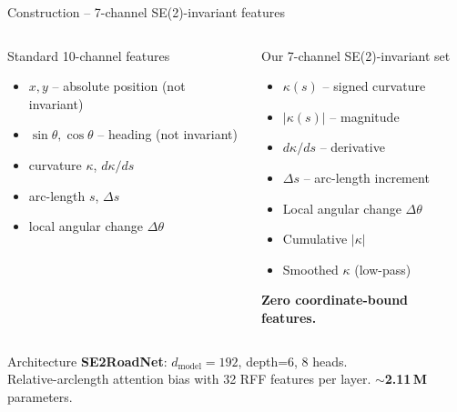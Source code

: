 \documentclass[aspectratio=169,10pt]{beamer}
\begin{document}
\begin{frame}{Construction -- 7-channel SE(2)-invariant features}
\begin{columns}[T]
\begin{block}{Standard 10-channel features}
\scriptsize
\begin{itemize}
  \item $x, y$ -- absolute position (\textcolor{alert}{not invariant})
  \item $\sin\theta, \cos\theta$ -- heading (\textcolor{alert}{not invariant})
  \item curvature $\kappa$, $d\kappa/ds$ \\
  \item arc-length $s$, $\Delta s$
  \item local angular change $\Delta\theta$
\end{itemize}
\end{block}

\begin{exampleblock}{Our 7-channel SE(2)-invariant set}
\scriptsize
\begin{itemize}
  \item $\kappa(s)$ -- signed curvature
  \item $|\kappa(s)|$ -- magnitude
  \item $d\kappa/ds$ -- derivative
  \item $\Delta s$ -- arc-length increment
  \item Local angular change $\Delta\theta$
  \item Cumulative $|\kappa|$
  \item Smoothed $\kappa$ (low-pass)
\end{itemize}
\textbf{Zero coordinate-bound features.}
\end{exampleblock}
\end{columns}

\begin{block}{Architecture}
\footnotesize
\textbf{SE2RoadNet}: $d_{\text{model}}=192$, depth=6, 8 heads. \\
Relative-arclength attention bias with 32 RFF features per layer.
$\sim$\textbf{2.11\,M} parameters.
\end{block}
\end{frame}
\end{document}
